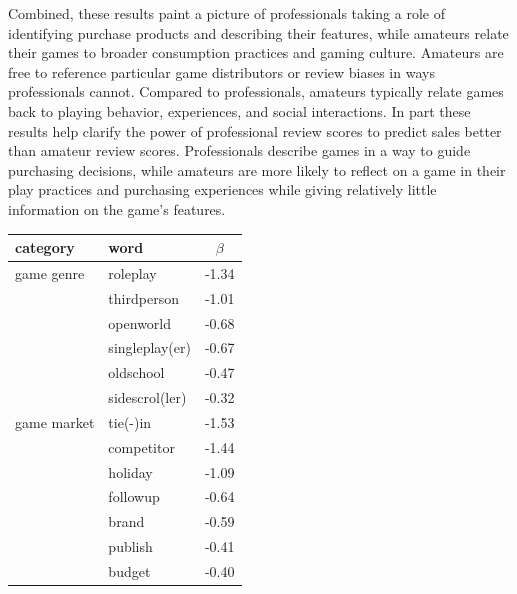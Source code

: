 \documentclass{sig-alternate}
\begin{document}
Combined, these results paint a picture of professionals taking a role of identifying purchase products and describing their features, while amateurs relate their games to broader consumption practices and gaming culture. Amateurs are free to reference particular game distributors or review biases in ways professionals cannot. Compared to professionals, amateurs typically relate games back to playing behavior, experiences, and social interactions. In part these results help clarify the power of professional review scores to predict sales better than amateur review scores. Professionals describe games in a way to guide purchasing decisions, while amateurs are more likely to reflect on a game in their play practices and purchasing experiences while giving relatively little information on the game's features.

\begin{table}[tb!]
\centering
\small
\sffamily
\begin{tabular}{llc}
\textbf{category} & \textbf{word} & $\beta$ \\ 
\midrule 
game genre 
& roleplay & -1.34 \\
& thirdperson & -1.01 \\
& openworld & -0.68 \\
& singleplay(er) & -0.67 \\
& oldschool & -0.47 \\
& sidescrol(ler) & -0.32 \\ [2ex]

\midrule 
game market 
& tie(-)in & -1.53 \\
& competitor & -1.44 \\ 
& holiday & -1.09 \\ 
& followup & -0.64 \\ 
& brand & -0.59 \\ 
& publish & -0.41 \\ 
& budget & -0.40 \\ [2ex]


\end{tabular}
\end{table}
\end{document}
